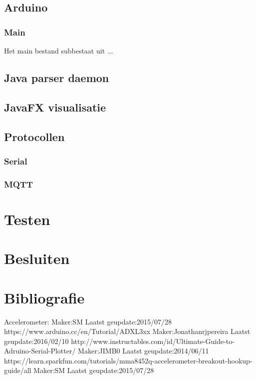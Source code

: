 \documentclass[a4paper]{report}
\begin{document}
\section{Arduino}
\subsection{Main}
Het main bestand subbestaat uit ...

\section{Java parser daemon}

\section{JavaFX visualisatie}

\section{Protocollen}
\subsection{Serial}

\subsection{MQTT}

\chapter{Testen}

\chapter{Besluiten}

\chapter{Bibliografie}
Accelerometer:
Maker:SM                  Laatst geupdate:2015/07/28      https://www.arduino.cc/en/Tutorial/ADXL3xx
Maker:Jonathanrjpereira   Laatst geupdate:2016/02/10      http://www.instructables.com/id/Ultimate-Guide-to-Adruino-Serial-Plotter/
Maker:JIMB0               Laatst geupdate:2014/06/11      https://learn.sparkfun.com/tutorials/mma8452q-accelerometer-breakout-hookup-guide/all
Maker:SM                  Laatst geupdate:2015/07/28
\end{document}

